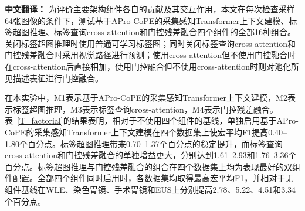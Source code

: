 \documentclass[Afour,sagev,times]{sagej}
\begin{document}
\textbf{中文翻译：} 为评价主要架构组件各自的贡献及其交互作用，本文在每次检查采样64张图像的条件下，测试基于APro-CoPE的采集感知Transformer上下文建模、标签超图推理、标签查询cross-attention和门控残差融合四个组件的全部16种组合。关闭标签超图推理时使用普通可学习标签图；同时关闭标签查询cross-attention和门控残差融合时采用视觉路径进行预测；使用cross-attention但不使用门控融合时在cross-attention后直接相加，使用门控融合但不使用cross-attention时则对池化所见描述表征进行门控融合。

在本实验中，M1表示基于APro-CoPE的采集感知Transformer上下文建模，M2表示标签超图推理，M3表示标签查询cross-attention，M4表示门控残差融合。表~\ref{T_factorial}的结果表明，相对于不使用四个组件的基线，单独启用基于APro-CoPE的采集感知Transformer上下文建模在四个数据集上使宏平均F1提高0.40--1.80个百分点。标签超图推理带来0.70--1.37个百分点的稳定提升，而标签查询cross-attention和门控残差融合的单独增益更大，分别达到1.61--2.93和1.76--3.36个百分点。标签超图推理与门控残差融合的组合在四个数据集上均为表现最好的双组件配置。全部四个组件同时启用时，各数据集均取得最高宏平均F1，并相对于无组件基线在WLE、染色胃镜、手术胃镜和EUS上分别提高2.78、5.22、4.51和3.34个百分点。
\end{document}
